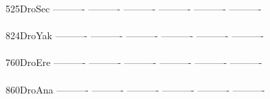\documentclass[11pt,twoside,reqno,a4paper]{article}
\begin{document}
{525\hspace*{2\charwidth}DroSec	----------	----------	----------	----------	----------	----------	\\
\hspace*{5\charwidth}\hspace*{7\charwidth}\hspace*{1\charwidth}\hspace*{1\charwidth}\hspace*{1\charwidth}\hspace*{1\charwidth}\hspace*{1\charwidth}\hspace*{1\charwidth}\\
824\hspace*{2\charwidth}DroYak	----------	----------	----------	----------	----------	----------	\\
\hspace*{5\charwidth}\hspace*{7\charwidth}\hspace*{1\charwidth}\hspace*{1\charwidth}\hspace*{1\charwidth}\hspace*{1\charwidth}\hspace*{1\charwidth}\hspace*{1\charwidth}\\
760\hspace*{2\charwidth}DroEre	----------	----------	----------	----------	----------	----------	\\
\hspace*{5\charwidth}\hspace*{7\charwidth}\hspace*{1\charwidth}\hspace*{1\charwidth}\hspace*{1\charwidth}\hspace*{1\charwidth}\hspace*{1\charwidth}\hspace*{1\charwidth}\\
860\hspace*{2\charwidth}DroAna	----------	----------	----------	----------	----------	----------	\\
\hspace*{5\charwidth}\hspace*{7\charwidth}\hspace*{1\charwidth}\hspace*{1\charwidth}\hspace*{1\charwidth}\hspace*{1\charwidth}\hspace*{1\charwidth}\hspace*{1\charwidth}\\
}
\end{document}
